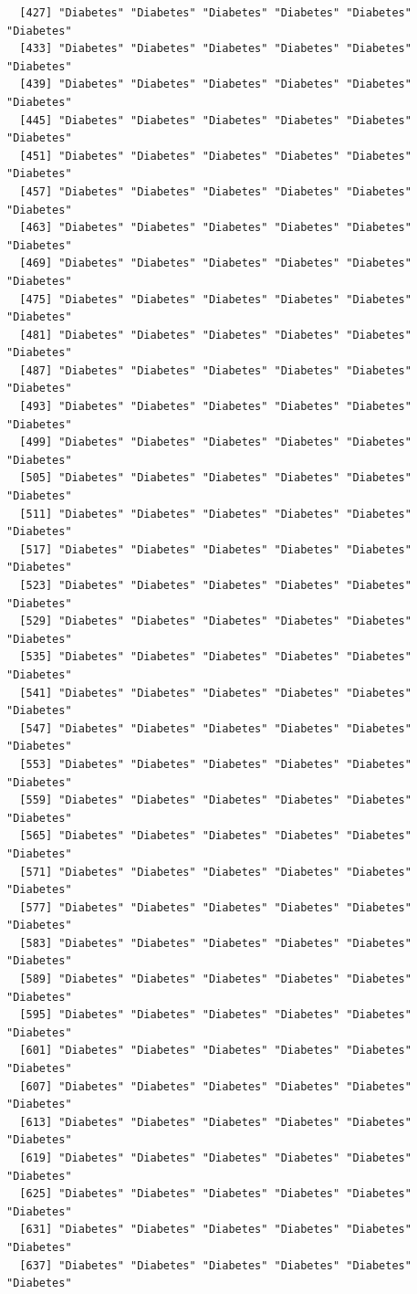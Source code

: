 \documentclass[
  letterpaper,
  DIV=11,
  numbers=noendperiod]{scrartcl}
\begin{document}
\begin{verbatim}
  [427] "Diabetes" "Diabetes" "Diabetes" "Diabetes" "Diabetes" "Diabetes"
  [433] "Diabetes" "Diabetes" "Diabetes" "Diabetes" "Diabetes" "Diabetes"
  [439] "Diabetes" "Diabetes" "Diabetes" "Diabetes" "Diabetes" "Diabetes"
  [445] "Diabetes" "Diabetes" "Diabetes" "Diabetes" "Diabetes" "Diabetes"
  [451] "Diabetes" "Diabetes" "Diabetes" "Diabetes" "Diabetes" "Diabetes"
  [457] "Diabetes" "Diabetes" "Diabetes" "Diabetes" "Diabetes" "Diabetes"
  [463] "Diabetes" "Diabetes" "Diabetes" "Diabetes" "Diabetes" "Diabetes"
  [469] "Diabetes" "Diabetes" "Diabetes" "Diabetes" "Diabetes" "Diabetes"
  [475] "Diabetes" "Diabetes" "Diabetes" "Diabetes" "Diabetes" "Diabetes"
  [481] "Diabetes" "Diabetes" "Diabetes" "Diabetes" "Diabetes" "Diabetes"
  [487] "Diabetes" "Diabetes" "Diabetes" "Diabetes" "Diabetes" "Diabetes"
  [493] "Diabetes" "Diabetes" "Diabetes" "Diabetes" "Diabetes" "Diabetes"
  [499] "Diabetes" "Diabetes" "Diabetes" "Diabetes" "Diabetes" "Diabetes"
  [505] "Diabetes" "Diabetes" "Diabetes" "Diabetes" "Diabetes" "Diabetes"
  [511] "Diabetes" "Diabetes" "Diabetes" "Diabetes" "Diabetes" "Diabetes"
  [517] "Diabetes" "Diabetes" "Diabetes" "Diabetes" "Diabetes" "Diabetes"
  [523] "Diabetes" "Diabetes" "Diabetes" "Diabetes" "Diabetes" "Diabetes"
  [529] "Diabetes" "Diabetes" "Diabetes" "Diabetes" "Diabetes" "Diabetes"
  [535] "Diabetes" "Diabetes" "Diabetes" "Diabetes" "Diabetes" "Diabetes"
  [541] "Diabetes" "Diabetes" "Diabetes" "Diabetes" "Diabetes" "Diabetes"
  [547] "Diabetes" "Diabetes" "Diabetes" "Diabetes" "Diabetes" "Diabetes"
  [553] "Diabetes" "Diabetes" "Diabetes" "Diabetes" "Diabetes" "Diabetes"
  [559] "Diabetes" "Diabetes" "Diabetes" "Diabetes" "Diabetes" "Diabetes"
  [565] "Diabetes" "Diabetes" "Diabetes" "Diabetes" "Diabetes" "Diabetes"
  [571] "Diabetes" "Diabetes" "Diabetes" "Diabetes" "Diabetes" "Diabetes"
  [577] "Diabetes" "Diabetes" "Diabetes" "Diabetes" "Diabetes" "Diabetes"
  [583] "Diabetes" "Diabetes" "Diabetes" "Diabetes" "Diabetes" "Diabetes"
  [589] "Diabetes" "Diabetes" "Diabetes" "Diabetes" "Diabetes" "Diabetes"
  [595] "Diabetes" "Diabetes" "Diabetes" "Diabetes" "Diabetes" "Diabetes"
  [601] "Diabetes" "Diabetes" "Diabetes" "Diabetes" "Diabetes" "Diabetes"
  [607] "Diabetes" "Diabetes" "Diabetes" "Diabetes" "Diabetes" "Diabetes"
  [613] "Diabetes" "Diabetes" "Diabetes" "Diabetes" "Diabetes" "Diabetes"
  [619] "Diabetes" "Diabetes" "Diabetes" "Diabetes" "Diabetes" "Diabetes"
  [625] "Diabetes" "Diabetes" "Diabetes" "Diabetes" "Diabetes" "Diabetes"
  [631] "Diabetes" "Diabetes" "Diabetes" "Diabetes" "Diabetes" "Diabetes"
  [637] "Diabetes" "Diabetes" "Diabetes" "Diabetes" "Diabetes" "Diabetes"

\end{verbatim}
\end{document}
